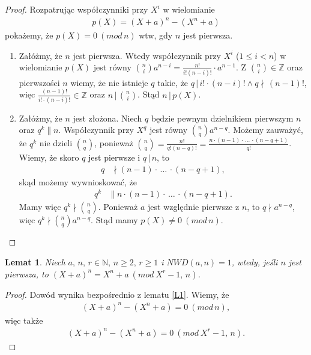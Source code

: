 \documentclass[declaration,shortabstract]{iithesis}
\theoremstyle{definition}
\theoremstyle{remark} \newtheorem{observation}{Obserwacja}
\theoremstyle{plain} \newtheorem{theorem}{Twierdzenie}
\theoremstyle{plain} \newtheorem{lemma}{Lemat}
\theoremstyle{remark} \newtheorem*{remark*}{Uwaga}
\theoremstyle{reminder} \newtheorem*{reminder*}{Przypomnienie}
\begin{document}
\begin{proof}
    Rozpatrując współczynniki przy $X^i$ w wielomianie 
    \begin{align*}
        p(X) = (X + a)^n - (X^n + a)  
    \end{align*}
    pokażemy, że $p(X) = 0 \: (mod \, n)$ wtw, gdy $n$ jest pierwsza. 
    \begin{enumerate}[label=(\arabic*),leftmargin=.4in]
	\item Załóżmy, że $n$ jest pierwsza. Wtedy współczynnik przy $X^i$ ($1 \leq i < n$) w wielomianie $p(X)$ jest równy ${n \choose i}a^{n-i} = \frac{n!}{i!(n-i)!} \cdot a^{n-1}$. Z ${n \choose i} \in \mathbb{Z}$ oraz pierwszości $n$ wiemy, że nie istnieje $q$ takie, że $q \, | \, i! \cdot (n-i)! \wedge q \nmid \, (n - 1)!$, więc $\frac{(n - 1)!}{i! \cdot (n - i)!} \in \mathbb{Z}$ oraz $n \, | \, {n \choose i}$. Stąd $n \, | \, p(X)$.
    \item Załóżmy, że $n$ jest złożona. Niech $q$ będzie pewnym dzielnikiem pierwszym $n$ oraz $q^k \parallel n$. Współczynnik przy $X^q$ jest równy ${n \choose q}a^{n-q}$. Możemy zauważyć, że $q^k$ nie dzieli ${n \choose q}$, ponieważ ${n \choose q} = \frac{n!}{q!(n-q)!} = \frac{n \cdot (n-1) \cdot \, \dots \, \cdot (n - q + 1)}{q!}$. Wiemy, że skoro $q$ jest pierwsze i $q \,| \, n$, to 
    \begin{align*}
        q & \nmid (n-1) \cdot \, \dots \, \cdot (n - q + 1),
    \end{align*}
    skąd możemy wywnioskować, że
    \begin{align*}
        q^k & \parallel n \cdot (n-1) \cdot \, \dots \, \cdot (n - q + 1).
    \end{align*}
    Mamy więc $q^k \nmid {n \choose q}$. Ponieważ $a$ jest względnie pierwsze z $n$, to $q \nmid a^{n-q}$, więc $q^k \nmid {n \choose q}a^{n-q}$. Stąd mamy $p(X) \neq 0 \: (mod \, n)$.
    \end{enumerate}
\end{proof}

\begin{lemma} \label{L2}
	Niech $a,\, n, \, r \in \mathbb{N},\, n \geq 2,\, r \geq 1$ i $NWD(a, n) = 1$, wtedy, jeśli $n$ jest pierwsza, to $(X + a)^n = X^n + a \: (mod \: X^r - 1,\, n)$.
\end{lemma}
	
\begin{proof}
    Dowód wynika bezpośrednio z lematu \ref{L1}. Wiemy, że 
    \begin{align*}
        (X + a)^n - (X^n + a) = 0 \: (mod \, n),
    \end{align*}
    więc także 
    \begin{align*}
        (X + a)^n - (X^n + a) = 0 \: (mod \: X^r - 1,\, n).
    \end{align*}
\end{proof}
\end{document}
